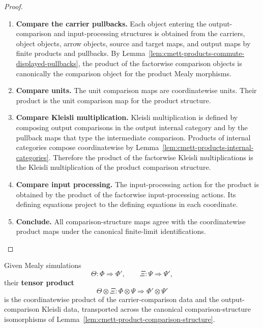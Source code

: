 \begin{proof}
    \leavevmode
    \begin{enumerate}
        \item \textbf{Compare the carrier pullbacks.}
        Each object entering the output-comparison and input-processing
        structures is obtained from the carriers, object objects, arrow
        objects, source and target maps, and output maps by finite products
        and pullbacks. By
        Lemma~\ref{lem:cmett-products-commute-displayed-pullbacks}, the
        product of the factorwise comparison objects is canonically the
        comparison object for the product Mealy morphisms.

        \item \textbf{Compare units.}
        The unit comparison maps are coordinatewise units. Their product is
        the unit comparison map for the product structure.

        \item \textbf{Compare Kleisli multiplication.}
        Kleisli multiplication is defined by composing output comparisons in
        the output internal category and by the pullback maps that type the
        intermediate comparison. Products of internal categories compose
        coordinatewise by Lemma~\ref{lem:cmett-products-internal-categories}.
        Therefore the product of the factorwise Kleisli multiplications is
        the Kleisli multiplication of the product comparison structure.

        \item \textbf{Compare input processing.}
        The input-processing action for the product is obtained by the
        product of the factorwise input-processing actions. Its defining
        equations project to the defining equations in each coordinate.

        \item \textbf{Conclude.}
        All comparison-structure maps agree with the coordinatewise product
        maps under the canonical finite-limit identifications.
    \end{enumerate}
\end{proof}

\begin{definition}
\label{def:cmett-tensor-product-simulations}
    Given Mealy simulations
    \[
        \Theta:\Phi\Rightarrow\Phi',
        \qquad
        \Xi:\Psi\Rightarrow\Psi',
    \]
    their \textbf{tensor product}
    \[
        \Theta\otimes\Xi:
        \Phi\otimes\Psi
        \Rightarrow
        \Phi'\otimes\Psi'
    \]
    is the coordinatewise product of the carrier-comparison data and the
    output-comparison Kleisli data, transported across the canonical
    comparison-structure isomorphisms of
    Lemma~\ref{lem:cmett-product-comparison-structure}.
\end{definition}

